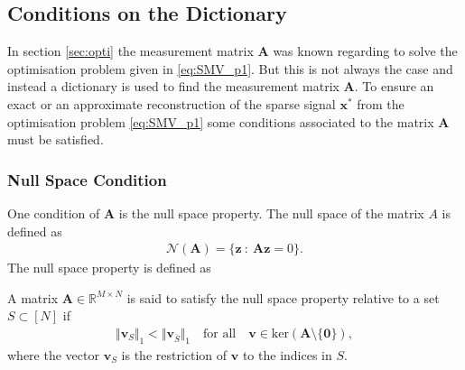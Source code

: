      
\subsection{Conditions on the Dictionary}\label{sec:dic_conditions}
In section \ref{sec:opti} the measurement matrix $\mathbf{A}$ was known regarding to solve the optimisation problem given in \eqref{eq:SMV_p1}. But this is not always the case and instead a dictionary is used to find the measurement matrix $\mathbf{A}$. To ensure an exact or an approximate reconstruction of the sparse signal $\mathbf{x}^\ast$ from the optimisation problem \eqref{eq:SMV_p1} some conditions associated to the matrix $\mathbf{A}$ must be satisfied.

\subsubsection{Null Space Condition}
One condition of $\mathbf{A}$ is the null space property. The null space of the matrix $A$ is defined as
\begin{align*}
\mathcal{N}(\mathbf{A}) = \{ \mathbf{z} \ : \ \mathbf{Az} = 0 \}.
\end{align*} 
The null space property is defined as
\begin{definition}
A matrix $\mathbf{A} \in \mathbb{R}^{M \times N}$ is said to satisfy the null space property relative to a set $S \subset [N]$ if
\begin{align}
\Vert \textbf{v}_S \Vert_1 < \Vert \textbf{v}_{\overline{S}} \Vert_1 \quad \text{for all} \quad \textbf{v} \in \text{ker}(\mathbf{A} \setminus \lbrace \textbf{0} \rbrace),
\end{align}
where the vector $\mathbf{v}_S$ is the restriction of $\mathbf{v}$ to the indices in $S$. 
\end{definition}

